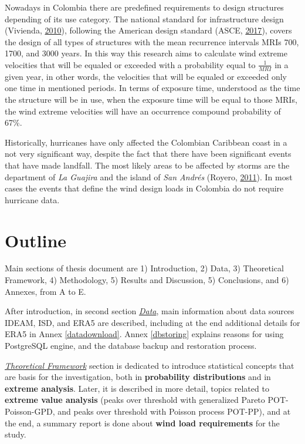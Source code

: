 \documentclass[12pt,twoside]{reedthesis}
\begin{document}
Nowadays in Colombia there are predefined requirements to design structures depending of its use category. The national standard for infrastructure design (Vivienda, \protect\hyperlink{ref-nsr10}{2010}), following the American design standard (ASCE, \protect\hyperlink{ref-Asce2017}{2017}), covers the design of all types of structures with the mean recurrence intervals MRIs 700, 1700, and 3000 years. In this way this research aims to calculate wind extreme velocities that will be equaled or exceeded with a probability equal to \(\frac{1}{MRI}\) in a given year, in other words, the velocities that will be equaled or exceeded only one time in mentioned periods. In terms of exposure time, understood as the time the structure will be in use, when the exposure time will be equal to those MRIs, the wind extreme velocities will have an occurrence compound probability of 67\%.

Historically, hurricanes have only affected the Colombian Caribbean coast in a not very significant way, despite the fact that there have been significant events that have made landfall. The most likely areas to be affected by storms are the department of \emph{La Guajira} and the island of \emph{San Andrés} (Royero, \protect\hyperlink{ref-Royero2011}{2011}). In most cases the events that define the wind design loads in Colombia do not require hurricane data.

\hypertarget{outline}{%
\section{Outline}\label{outline}}

Main sections of thesis document are 1) Introduction, 2) Data, 3) Theoretical Framework, 4) Methodology, 5) Results and Discussion, 5) Conclusions, and 6) Annexes, from A to E.

After introduction, in second section \emph{\protect\hyperlink{rmd-data}{Data}}, main information about data sources IDEAM, ISD, and ERA5 are described, including at the end additional details for ERA5 in Annex \ref{datadownload}. Annex \ref{dbstoring} explains reasons for using PostgreSQL engine, and the database backup and restoration process.

\emph{\protect\hyperlink{rmd-thefra}{Theoretical Framework}} section is dedicated to introduce statistical concepts that are basis for the investigation, both in \textbf{probability distributions} and in \textbf{extreme analysis}. Later, it is described in more detail, topics related to \textbf{extreme value analysis} (peaks over threshold with generalized Pareto POT-Poisson-GPD, and peaks over threshold with Poisson process POT-PP), and at the end, a summary report is done about \textbf{wind load requirements} for the study.
\end{document}
